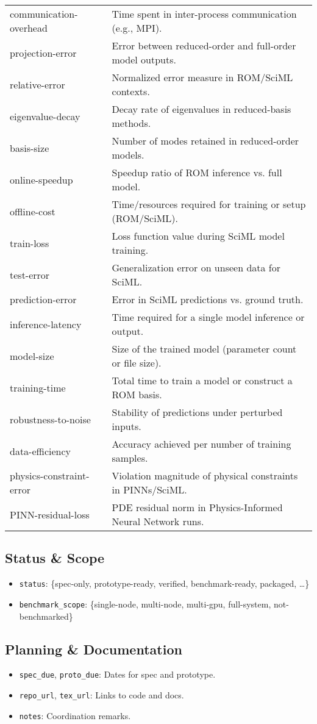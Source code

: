 \begin{longtable}{@{}p{}p{}@{}}
communication-overhead     & Time spent in inter-process communication (e.g., MPI). \\
projection-error           & Error between reduced-order and full-order model outputs. \\
relative-error             & Normalized error measure in ROM/SciML contexts. \\
eigenvalue-decay           & Decay rate of eigenvalues in reduced-basis methods. \\
basis-size                 & Number of modes retained in reduced-order models. \\
online-speedup             & Speedup ratio of ROM inference vs. full model. \\
offline-cost               & Time/resources required for training or setup (ROM/SciML). \\
train-loss                 & Loss function value during SciML model training. \\
test-error                 & Generalization error on unseen data for SciML. \\
prediction-error           & Error in SciML predictions vs. ground truth. \\
inference-latency          & Time required for a single model inference or output. \\
model-size                 & Size of the trained model (parameter count or file size). \\
training-time              & Total time to train a model or construct a ROM basis. \\
robustness-to-noise        & Stability of predictions under perturbed inputs. \\
data-efficiency            & Accuracy achieved per number of training samples. \\
physics-constraint-error   & Violation magnitude of physical constraints in PINNs/SciML. \\
PINN-residual-loss         & PDE residual norm in Physics-Informed Neural Network runs. \\

\bottomrule
\end{longtable}

\subsection{Status \& Scope}
\begin{itemize}
  \item \texttt{status}: \{spec-only, prototype-ready, verified, benchmark-ready, packaged, …\}  
  \item \texttt{benchmark\_scope}: \{single-node, multi-node, multi-gpu, full-system, not-benchmarked\}
\end{itemize}

\subsection{Planning \& Documentation}
\begin{itemize}
  \item \texttt{spec\_due}, \texttt{proto\_due}: Dates for spec and prototype.  
  \item \texttt{repo\_url}, \texttt{tex\_url}: Links to code and docs.  
  \item \texttt{notes}: Coordination remarks.
\end{itemize}